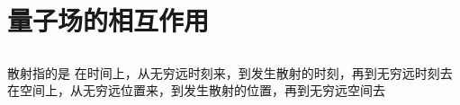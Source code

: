 \section{量子场的相互作用}
\subsection{}





























\subsection{}





散射指的是
在时间上，从无穷远时刻来，到发生散射的时刻，再到无穷远时刻去
在空间上，从无穷远位置来，到发生散射的位置，再到无穷远空间去















\subsection{}
























